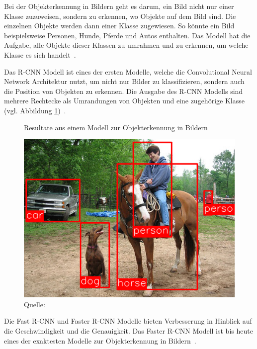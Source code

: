 Bei der Objekterkennung in Bildern geht es darum, ein Bild nicht nur einer Klasse zuzuweisen, sondern zu erkennen, wo Objekte auf dem Bild sind. Die einzelnen Objekte werden dann einer Klasse zugewiesen. So könnte ein Bild beispielsweise Personen, Hunde, Pferde und Autos enthalten. Das Modell hat die Aufgabe, alle Objekte dieser Klassen zu umrahmen und zu erkennen, um welche Klasse es sich handelt~\autocite{Goodfellow2016}.

Das R-CNN Modell ist eines der ersten Modelle, welche die Convolutional Neural Network Architektur nutzt, um nicht nur Bilder zu klassifizieren, sondern auch die Position von Objekten zu erkennen. Die Ausgabe des R-CNN Modells sind mehrere Rechtecke als Umrandungen von Objekten und eine zugehörige Klasse (vgl. Abbildung \ref{fig:rcnn})~\autocite{SSD}.

\begin{figure}[h]
    \captionsetup{width=.9\linewidth}
    \caption{Resultate aus einem Modell zur Objekterkennung in Bildern}
    \label{fig:rcnn}
    \centering
    \includegraphics[scale=0.4]{graphics/rcnn.png}
    \vspace*{0.3cm}
    \caption*{Quelle: \textcite{SSD}}
\end{figure}

Die Fast R-CNN und Faster R-CNN Modelle bieten Verbesserung in Hinblick auf die Geschwindigkeit und die Genauigkeit. Das Faster R-CNN Modell ist bis heute eines der exaktesten Modelle zur Objekterkennung in Bildern~\autocite{SSD}.

